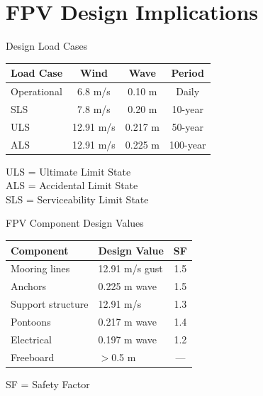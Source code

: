 \documentclass[10pt]{beamer}
\begin{document}
\section{FPV Design Implications}

\begin{frame}{Design Load Cases}
\begin{table}
\centering
\begin{tabular}{lccc}
\hline
\textbf{Load Case} & \textbf{Wind} & \textbf{Wave} & \textbf{Period} \\
\hline
Operational & 6.8 m/s & 0.10 m & Daily \\
SLS & 7.8 m/s & 0.20 m & 10-year \\
\alert{ULS} & \alert{12.91 m/s} & \alert{0.217 m} & \alert{50-year} \\
\alert{ALS} & \alert{12.91 m/s} & \alert{0.225 m} & \alert{100-year} \\
\hline
\end{tabular}
\end{table}

ULS = Ultimate Limit State\\
ALS = Accidental Limit State\\
SLS = Serviceability Limit State
\end{frame}

\begin{frame}{FPV Component Design Values}
\begin{table}
\centering
\begin{tabular}{llc}
\hline
\textbf{Component} & \textbf{Design Value} & \textbf{SF} \\
\hline
Mooring lines & 12.91 m/s gust & 1.5 \\
Anchors & 0.225 m wave & 1.5 \\
Support structure & 12.91 m/s & 1.3 \\
Pontoons & 0.217 m wave & 1.4 \\
Electrical & 0.197 m wave & 1.2 \\
Freeboard & $>$0.5 m & --- \\
\hline
\end{tabular}
\end{table}

SF = Safety Factor
\end{frame}
\end{document}
